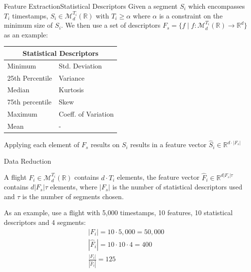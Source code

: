 \documentclass{beamer}
\begin{document}
            \begin{frame}{Feature Extraction}{Statistical Descriptors}
                Given a segment $S_{i}$ which encompasses $T_i$ timestamps, $S_i \in \mathcal{M}_{d}^{T_i}(\mathbb{R})$ with $T_i \geq \alpha$ where $\alpha$ is a constraint on the minimum size of $S_i$. We then use a set of descriptors $F_s = \{f \mid  f: \mathcal{M}_{d}^{T_i}(\mathbb{R}) \rightarrow \mathbb{R}^{d}\}$ as an example:
                \begin{table}[!htbp]
                    \begin{tabular}{ll}
                    \multicolumn{2}{c}{Statistical Descriptors} \\ \hline
                    Minimum & Std. Deviation \\
                    25th Percentile & Variance \\
                    Median & Kurtosis \\
                    75th percentile & Skew \\
                    Maximum & Coeff. of Variation \\
                    Mean & - \\ \hline
                    \end{tabular}
                \end{table}

                Applying each element of $F_s$ results on $S_i$ results in a feature vector $\hat{S}_i \in \mathbb{R}^{d \cdot |F_s|}$
            \end{frame}

            \begin{frame}{Data Reduction}

                A flight $F_i \in \mathcal{M}_{d}^{T_i}(\mathbb{R})$ contains $d \cdot T_i$ elements, the feature vector $\hat{F}_i \in \mathbb{R}^{d |F_s| \tau}$ contains $ d |F_s| \tau$ elements, where $|F_s|$ is the number of statistical descriptors used and $\tau$ is the number of segments chosen.

                As an example, use a flight with 5,000 timestamps, 10 features, 10 statistical descriptors and 4 segments:
                \begin{gather}
                    | F_i | = 10 \cdot 5,000 = 50,000 \\
                    | \hat{F}_i | = 10 \cdot 10 \cdot 4 = 400 \\
                    \frac{ | F_i | }{ | \hat{F}_i | } = 125 \label{eq:data-reduction}
                \end{gather}
            \end{frame}
\end{document}
